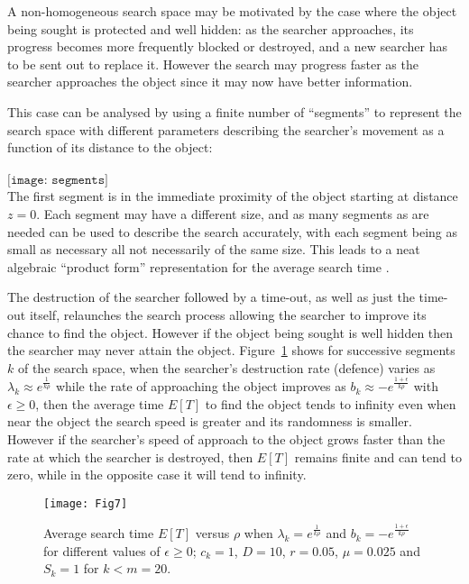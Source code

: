 \documentclass[journal]{IEEEtran}
\begin{document}
A non-homogeneous search space may be  motivated
by the case where the object being sought is protected and well hidden: as the searcher approaches, its progress becomes more frequently blocked or destroyed, and a new searcher has to be sent out to replace it. However the search may progress faster as the searcher approaches the object
since it may now have better information.

This case can be analysed by using a finite number of ``segments'' to represent the search space with  different parameters describing the searcher's movement as a function of its distance to the object:\\
\\
$ \texttt{[image: segments]}$\\
The first segment is in the immediate proximity of the object starting at distance $z=0$. Each segment may have a different size, and  as many segments as are needed can be used to describe the search accurately, with each segment being as small as necessary all not necessarily of the same size. This leads to a neat algebraic ``product form'' representation for the average search time \cite{CJ-diffusion2012}.






The destruction of the searcher followed by a time-out, as well as just the time-out itself,  relaunches the search process allowing the searcher to improve its chance to find the object. However if the object being sought is well hidden then the searcher may never attain the object. Figure~\ref{fig7} shows for successive segments $k$ of the search space, when the searcher's destruction rate (defence) varies as  $\lambda_k\approx e^{\frac{1}{k\rho}}$ while the rate of approaching the object improves
as  $b_k \approx -e^{\frac{1+\epsilon}{k\rho}}$ with $\epsilon \geq 0$, then the average time $E[T]$ to find the object tends to infinity even when near the object the search speed is greater and its randomness is smaller. However if  the searcher's speed of approach to the object grows faster than the rate at which the searcher is  destroyed, then $E[T]$ remains finite and can tend to zero, while in the opposite case it will tend to infinity.

\begin{figure}[t]\centering
\texttt{[image: Fig7]}
\caption{ \label{fig7} Average search time $E[T]$ versus $\rho$ when $\lambda_k = e^{\frac{1}{k\rho}}$ and $b_k = - e^{\frac{1+\epsilon}{k\rho}}$ for different values of $\epsilon\geq 0$; $c_k=1$, $D=10$, $r=0.05$, $\mu=0.025$ and $S_k = 1$ for $k < m=20$.}
\end{figure}
\end{document}
